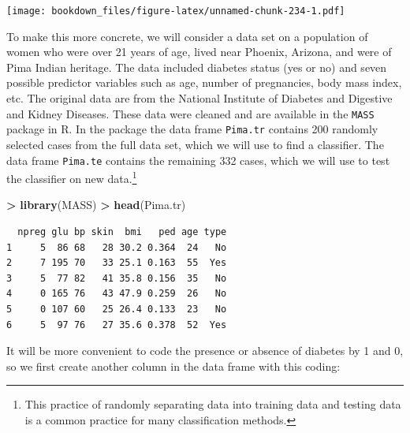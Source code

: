 \documentclass[]{krantz}
\makeatletter
\newenvironment{Shaded}{\begin{snugshade}}{\end{snugshade}}
\newcommand{\KeywordTok}[1]{\textcolor[rgb]{0.27,0.27,0.27}{\textbf{#1}}}
\newcommand{\DecValTok}[1]{\textcolor[rgb]{0.06,0.06,0.06}{#1}}
\newcommand{\StringTok}[1]{\textcolor[rgb]{0.5,0.5,0.5}{#1}}
\newcommand{\OperatorTok}[1]{\textcolor[rgb]{0.43,0.43,0.43}{\textbf{#1}}}
\newcommand{\NormalTok}[1]{#1}
\newenvironment{kframe}{%
\medskip{}
\setlength{\fboxsep}{.8em}
 \def\at@end@of@kframe{}%
 \ifinner\ifhmode%
  \def\at@end@of@kframe{\end{minipage}}%
  \begin{minipage}{\columnwidth}%
 \fi\fi%
 \def\FrameCommand##1{\hskip\@totalleftmargin \hskip-\fboxsep
 \colorbox{shadecolor}{##1}\hskip-\fboxsep
     \hskip-\linewidth \hskip-\@totalleftmargin \hskip\columnwidth}%
 \MakeFramed {\advance\hsize-\width
   \@totalleftmargin\z@ \linewidth\hsize
   \@setminipage}}%
 {\par\unskip\endMakeFramed%
 \at@end@of@kframe}
\renewenvironment{Shaded}{\begin{kframe}}{\end{kframe}}
\makeatother
\begin{document}
\texttt{[image: bookdown\_files/figure-latex/unnamed-chunk-234-1.pdf]}

To make this more concrete, we will consider a data set on a population
of women who were over 21 years of age, lived near Phoenix, Arizona, and
were of Pima Indian heritage. The data included diabetes status (yes or
no) and seven possible predictor variables such as age, number of
pregnancies, body mass index, etc. The original data are from the
National Institute of Diabetes and Digestive and Kidney Diseases. These
data were cleaned and are available in the \texttt{MASS} package in R.
In the package the data frame \texttt{Pima.tr} contains 200 randomly
selected cases from the full data set, which we will use to find a
classifier. The data frame \texttt{Pima.te} contains the remaining 332
cases, which we will use to test the classifier on new data.\footnote{This
  practice of randomly separating data into training data and testing
  data is a common practice for many classification methods.}

\begin{Shaded}
\begin{Highlighting}[]
\OperatorTok{>}\StringTok{ }\KeywordTok{library}\NormalTok{(MASS)}
\OperatorTok{>}\StringTok{ }\KeywordTok{head}\NormalTok{(Pima.tr)}
\end{Highlighting}
\end{Shaded}

\begin{verbatim}
  npreg glu bp skin  bmi   ped age type
1     5  86 68   28 30.2 0.364  24   No
2     7 195 70   33 25.1 0.163  55  Yes
3     5  77 82   41 35.8 0.156  35   No
4     0 165 76   43 47.9 0.259  26   No
5     0 107 60   25 26.4 0.133  23   No
6     5  97 76   27 35.6 0.378  52  Yes
\end{verbatim}

It will be more convenient to code the presence or absence of diabetes
by 1 and 0, so we first create another column in the data frame with
this coding:

\begin{Shaded}
\end{Shaded}
\end{document}
